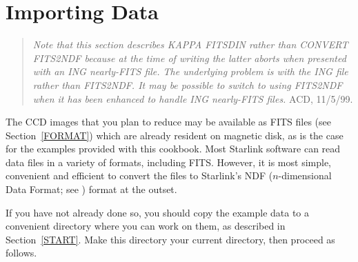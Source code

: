 \documentclass[twoside,11pt]{starlink}
\begin{document}
\newpage
\section{\label{CONVERSION}Importing Data}

\begin{quote}
\emph{
Note that this section describes KAPPA FITSDIN rather than CONVERT
FITS2NDF because at the time of writing the latter aborts when presented with an ING nearly-FITS
file.  The underlying problem is with the ING file rather than FITS2NDF.
It may be possible to switch to using FITS2NDF when it has been enhanced
to handle ING nearly-FITS files.
}
ACD, 11/5/99.
\end{quote}

The CCD images that you plan to reduce may be available as FITS files
(see Section~\ref{FORMAT}) which are already resident on magnetic disk,
as is the case for the examples provided with this cookbook.  Most
Starlink software can read data files in a variety of formats, including
FITS.  However, it is most simple, convenient and efficient to convert
the files to Starlink's NDF ($n$-dimensional Data Format; see
\cite{SUN33}) format at the outset.

If you have not already done so, you should copy the example data to
a convenient directory where you can work on them, as described in
Section~\ref{START}.  Make this directory your current directory, then
proceed as follows.
\end{document}
